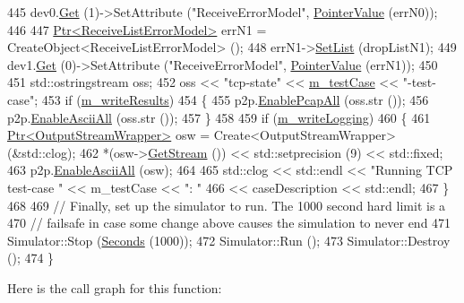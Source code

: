 \begin{DoxyCode}
445   dev0.\hyperlink{classns3_1_1NetDeviceContainer_a677d62594b5c9d2dea155cc5045f4d0b}{Get} (1)->SetAttribute (\textcolor{stringliteral}{"ReceiveErrorModel"}, \hyperlink{classns3_1_1PointerValue}{PointerValue} (errN0));
446 
447   \hyperlink{classns3_1_1Ptr}{Ptr<ReceiveListErrorModel>} errN1 = CreateObject<ReceiveListErrorModel> ();
448   errN1->\hyperlink{classns3_1_1ReceiveListErrorModel_ae710ec96d43c47bedb5d941351a4d809}{SetList} (dropListN1);
449   dev1.\hyperlink{classns3_1_1NetDeviceContainer_a677d62594b5c9d2dea155cc5045f4d0b}{Get} (0)->SetAttribute (\textcolor{stringliteral}{"ReceiveErrorModel"}, \hyperlink{classns3_1_1PointerValue}{PointerValue} (errN1));
450 
451   std::ostringstream oss;
452   oss << \textcolor{stringliteral}{"tcp-state"} << \hyperlink{classNs3TcpStateTestCase_af1ec330b601d913a2fcafce1a4bd799e}{m\_testCase} << \textcolor{stringliteral}{"-test-case"};
453   \textcolor{keywordflow}{if} (\hyperlink{classNs3TcpStateTestCase_aebae71fa01360a4e38a656828d5bd466}{m\_writeResults})
454     \{
455       p2p.\hyperlink{classns3_1_1PcapHelperForDevice_a4ab183a2512120200d4a0e5d8ececd49}{EnablePcapAll} (oss.str ());
456       p2p.\hyperlink{classns3_1_1AsciiTraceHelperForDevice_a63e57c878526c732924e14c1e52cca8b}{EnableAsciiAll} (oss.str ());
457     \}
458 
459   \textcolor{keywordflow}{if} (\hyperlink{classNs3TcpStateTestCase_a738c5da39e4cbbbfdc5f789675c9405a}{m\_writeLogging})
460     \{
461       \hyperlink{classns3_1_1Ptr}{Ptr<OutputStreamWrapper>} osw = Create<OutputStreamWrapper> (&std::clog);
462       *(osw->\hyperlink{classns3_1_1OutputStreamWrapper_a0cf30a4188ab6fdae2b2ab74db11acc2}{GetStream} ()) << std::setprecision (9) << std::fixed;
463       p2p.\hyperlink{classns3_1_1AsciiTraceHelperForDevice_a63e57c878526c732924e14c1e52cca8b}{EnableAsciiAll} (osw);
464 
465       std::clog << std::endl << \textcolor{stringliteral}{"Running TCP test-case "} << m\_testCase << \textcolor{stringliteral}{": "}
466                 << caseDescription << std::endl;
467     \}
468 
469   \textcolor{comment}{// Finally, set up the simulator to run.  The 1000 second hard limit is a}
470   \textcolor{comment}{// failsafe in case some change above causes the simulation to never end}
471   Simulator::Stop (\hyperlink{group__timecivil_ga33c34b816f8ff6628e33d5c8e9713b9e}{Seconds} (1000));
472   Simulator::Run ();
473   Simulator::Destroy ();
474 \}
\end{DoxyCode}


Here is the call graph for this function\+:


